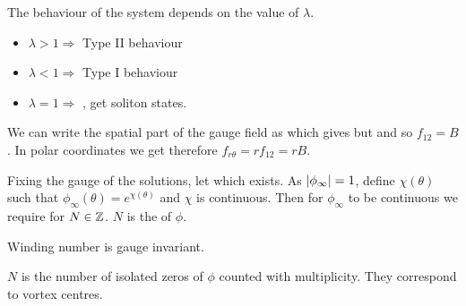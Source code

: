 \documentclass{article}
\begin{document}
\begin{definition}
The behaviour of the system depends on the value of $\lambda$. 
\begin{itemize}
    \item $\lambda > 1 \Rightarrow$ Type II behaviour
    \item $\lambda < 1 \Rightarrow$ Type I behaviour
    \item $\lambda = 1 \Rightarrow$ , get soliton states. 
\end{itemize}
\end{definition}

\begin{lemma}
We can write the spatial part of the gauge field as 
which gives 
but 
and so $f_{12} = B$. In polar coordinates we get therefore $f_{r\theta} = r f_{12} = rB$. 
\end{lemma}

\begin{definition}
Fixing the gauge of the solutions, let 
which exists. As $\left\lvert \phi_\infty \right\rvert = 1$, define $\chi(\theta)$ such that $\phi_\infty(\theta) = e^{\chi(\theta)}$ and $\chi$ is continuous. Then for $\phi_\infty$ to be continuous we require 
for $N\in\mathbb{Z}$. $N$ is the  of $\phi$. 
\end{definition}

\begin{prop}
Winding number is gauge invariant. 
\end{prop}

\begin{prop}
$N$ is the number of isolated zeros of $\phi$ counted with multiplicity. They correspond to vortex centres. 
\end{prop}
\end{document}
